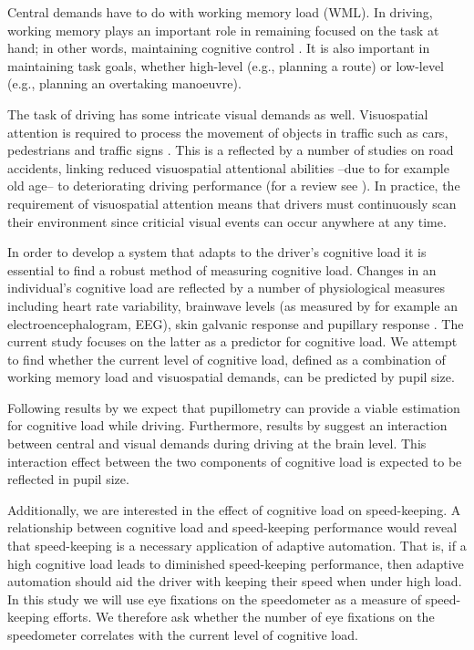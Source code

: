 Central demands have to do with working memory load (WML).
In driving, working memory plays an important role in remaining focused on the task at hand; in other words, maintaining cognitive control \citep{Wood2016}.
It is also important in maintaining task goals, whether high-level (e.g., planning a route) or low-level (e.g., planning an overtaking manoeuvre).

The task of driving has some intricate visual demands as well.
Visuospatial attention is required to process the movement of objects in traffic such as cars, pedestrians and traffic signs \citep{Zheng2020}.
This is a reflected by a number of studies on road accidents, linking reduced visuospatial attentional abilities --due to for example old age-- to deteriorating driving performance (for a review see \citealp{Owsley2010}).
In practice, the requirement of visuospatial attention means that drivers must continuously scan their environment since criticial visual events can occur anywhere at any time.

In order to develop a system that adapts to the driver's cognitive load it is essential to find a robust method of measuring cognitive load.
Changes in an individual's cognitive load are reflected by a number of physiological measures including heart rate variability, brainwave levels (as measured by for example an electroencephalogram, EEG), skin galvanic response and pupillary response \citep{Haapalainen2010}.
The current study focuses on the latter as a predictor for cognitive load. We attempt to find whether the current level of cognitive load, defined as a combination of working memory load and visuospatial demands, can be predicted by pupil size.

Following results by \citet{Palinko2010} we expect that pupillometry can provide a viable estimation for cognitive load while driving. 
Furthermore, results by \citet{Scheunemann2019} suggest an interaction between central and visual demands during driving at the brain level.
This interaction effect between the two components of cognitive load is expected to be reflected in pupil size.

Additionally, we are interested in the effect of cognitive load on speed-keeping.
A relationship between cognitive load and speed-keeping performance would reveal that speed-keeping is a necessary application of adaptive automation. 
That is, if a high cognitive load leads to diminished speed-keeping performance, then adaptive automation should aid the driver with keeping their speed when under high load.
In this study we will use eye fixations on the speedometer as a measure of speed-keeping efforts. 
We therefore ask whether the number of eye fixations on the speedometer correlates with the current level of cognitive load.

